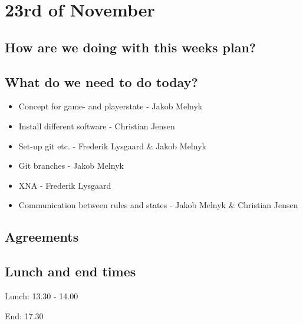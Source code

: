 \section{23rd of November}
\subsection{How are we doing with this weeks plan?}

\subsection{What do we need to do today?}
\begin{itemize}
\item Concept for game- and playerstate - Jakob Melnyk
\item Install different software - Christian Jensen
\item Set-up git etc. - Frederik Lysgaard \& Jakob Melnyk
\item Git branches - Jakob Melnyk
\item XNA - Frederik Lysgaard
\item Communication between rules and states - Jakob Melnyk \& Christian Jensen
\end{itemize}

\subsection{Agreements}

\subsection{Lunch and end times}
Lunch: 13.30 - 14.00

End: 17.30
